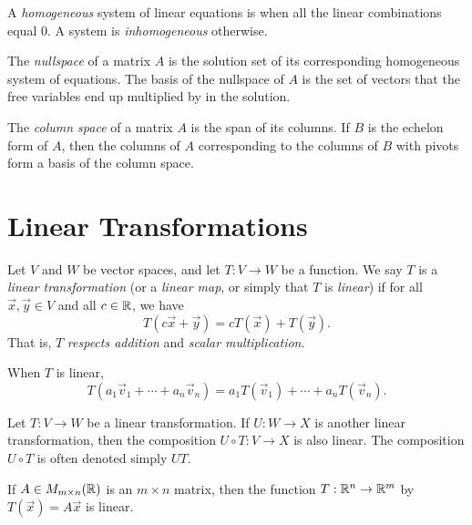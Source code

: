 \begin{definition}
	A \emph{homogeneous} system of linear equations is when all the linear
	combinations equal 0. A system is \emph{inhomogeneous} otherwise.
\end{definition}

\begin{definition}
	The \emph{nullspace} of a matrix $A$ is the solution set of its
	corresponding homogeneous system of equations. The basis of the nullspace
	of $A$ is the set of vectors that the free variables end up multiplied by in
	the solution.
\end{definition}

\begin{definition}
	The \emph{column space} of a matrix $A$ is the span of its columns. If $B$ is
	the echelon form of $A$, then the columns of $A$ corresponding to the
	columns of $B$ with pivots form a basis of the column space.
\end{definition}

\section*{Linear Transformations}

\begin{definition}
	Let $V$ and $W$ be vector spaces, and let $T : V \rightarrow W$ be a function.
	We say $T$ is a \emph{linear transformation} (or a \emph{linear map}, or
	simply that $T$ is \emph{linear}) if for all $\vec{x}, \vec{y} \in V$ and all
	$c \in {\mathbb{R}}$, we have
	\[
		T(c\vec{x} + \vec{y}) = cT(\vec{x}) + T(\vec{y}).
	\]
	That is, $T$ \emph{respects addition} and \emph{scalar multiplication}.
\end{definition}

\begin{corollary}
	When $T$ is linear,
	\[
		T(a_1 \vec{v}_1 + \cdots + a_n \vec{v}_n) = a_1 T(\vec{v}_1) + \cdots + a_n
		T(\vec{v}_n).
	\]
\end{corollary}

\begin{theorem}
	Let $T : V \rightarrow W$ be a linear transformation. If $U : W \rightarrow X$
	is another linear transformation, then the composition $U \circ T : V
	\rightarrow X$ is also linear. The composition $U \circ T$ is often denoted
	simply $UT$.
\end{theorem}

\begin{theorem}
	If $A \in M_{m \times n}({\mathbb{R}})$ is an $m \times n$ matrix, then the function $T
	: {\mathbb{R}}^n \rightarrow {\mathbb{R}}^m$ by $T(\vec{x}) = A\vec{x}$ is linear.
\end{theorem}


